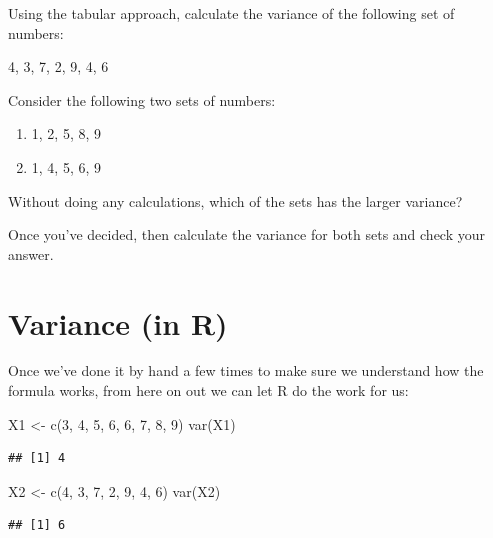 \documentclass[
]{book}
\newenvironment{Shaded}{\begin{snugshade}}{\end{snugshade}}
\newcommand{\DecValTok}[1]{\textcolor[rgb]{0.00,0.00,0.81}{#1}}
\newcommand{\FunctionTok}[1]{\textcolor[rgb]{0.00,0.00,0.00}{#1}}
\newcommand{\NormalTok}[1]{#1}
\newcommand{\OtherTok}[1]{\textcolor[rgb]{0.56,0.35,0.01}{#1}}
\begin{document}
Using the tabular approach, calculate the variance of the following set of numbers:

4, 3, 7, 2, 9, 4, 6

Consider the following two sets of numbers:

\begin{enumerate}
\def\labelenumi{\Alph{enumi})}
\item
  1, 2, 5, 8, 9
\item
  1, 4, 5, 6, 9
\end{enumerate}

Without doing any calculations, which of the sets has the larger variance?

Once you've decided, then calculate the variance for both sets and check your answer.

\hypertarget{variance-r}{%
\section{Variance (in R)}\label{variance-r}}

Once we've done it by hand a few times to make sure we understand how the formula works, from here on out we can let R do the work for us:

\begin{Shaded}
\begin{Highlighting}[]
\NormalTok{X1 }\OtherTok{\textless{}{-}} \FunctionTok{c}\NormalTok{(}\DecValTok{3}\NormalTok{, }\DecValTok{4}\NormalTok{, }\DecValTok{5}\NormalTok{, }\DecValTok{6}\NormalTok{, }\DecValTok{6}\NormalTok{, }\DecValTok{7}\NormalTok{, }\DecValTok{8}\NormalTok{, }\DecValTok{9}\NormalTok{)}
\FunctionTok{var}\NormalTok{(X1)}
\end{Highlighting}
\end{Shaded}

\begin{verbatim}
## [1] 4
\end{verbatim}

\begin{Shaded}
\begin{Highlighting}[]
\NormalTok{X2 }\OtherTok{\textless{}{-}} \FunctionTok{c}\NormalTok{(}\DecValTok{4}\NormalTok{, }\DecValTok{3}\NormalTok{, }\DecValTok{7}\NormalTok{, }\DecValTok{2}\NormalTok{, }\DecValTok{9}\NormalTok{, }\DecValTok{4}\NormalTok{, }\DecValTok{6}\NormalTok{)}
\FunctionTok{var}\NormalTok{(X2)}
\end{Highlighting}
\end{Shaded}

\begin{verbatim}
## [1] 6
\end{verbatim}
\end{document}
